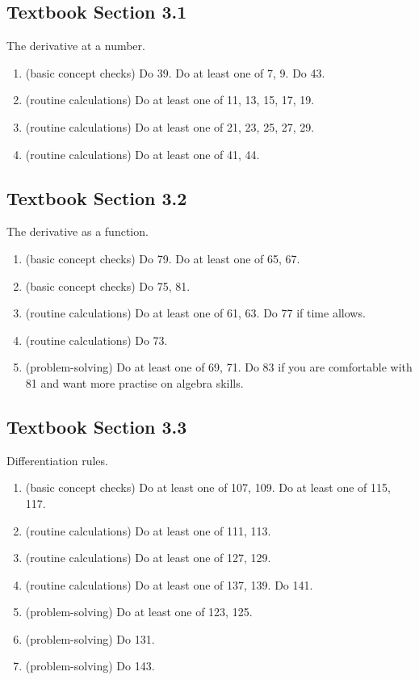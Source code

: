 \documentclass[../main.tex]{subfiles}
\begin{document}
\subsection*{Textbook Section 3.1}

The derivative at a number.
\begin{enumerate}
  \item(basic concept checks) Do 39. Do at least one of 7, 9. Do 43.
  \item(routine calculations) Do at least one of 11, 13, 15, 17, 19.
  \item(routine calculations) Do at least one of 21, 23, 25, 27, 29.
  \item(routine calculations) Do at least one of 41, 44.
\end{enumerate}

\subsection*{Textbook Section 3.2}

The derivative as a function.
\begin{enumerate}
  \item (basic concept checks) Do 79. Do at least one of 65, 67.
  \item (basic concept checks) Do 75, 81.
  \item (routine calculations) Do at least one of 61, 63. Do 77 if time allows.
  \item (routine calculations) Do 73.
  \item (problem-solving) Do at least one of 69, 71. Do 83 if you are comfortable with 81 and want more practise on algebra skills.
\end{enumerate}

\clearpage
\subsection*{Textbook Section 3.3}

Differentiation rules.
\begin{enumerate}
  \item (basic concept checks) Do at least one of 107, 109. Do at least one of 115, 117.
  \item (routine calculations) Do at least one of 111, 113.
  \item (routine calculations) Do at least one of 127, 129.
  \item (routine calculations) Do at least one of 137, 139. Do 141.
  \item (problem-solving) Do at least one of 123, 125.
  \item (problem-solving) Do 131.
  \item (problem-solving) Do 143.
\end{enumerate}
\end{document}

